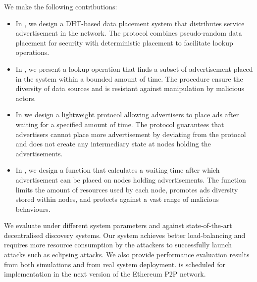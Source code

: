  We make the following contributions:
\begin{itemize}
    \item In , we design a DHT-based data placement system that distributes service advertisement in the network. The protocol combines pseudo-random data placement for security with deterministic placement to facilitate lookup operations. 
    \item In , we present a lookup operation that finds a subset of advertisement placed in the system within a bounded amount of time. The procedure ensure the diversity of data sources and is resistant against manipulation by malicious actors. 
    \item In  we design a lightweight protocol allowing advertisers to place ads after waiting for a specified amount of time. The protocol guarantees that advertisers cannot place more advertisement by deviating from the protocol and does not create any intermediary state at nodes holding the advertisements. 
    \item In , we design a function that calculates a waiting time after which advertisement can be placed on nodes holding advertisements. The function limits the amount of resources used by each node, promotes ads diversity stored within nodes, and protects against a vast range of malicious behaviours. 
\end{itemize}

We evaluate \sysname under different system parameters and against state-of-the-art decentralised discovery systems. Our system achieves better load-balancing and requires more resource consumption by the attackers to successfully launch attacks such as eclipsing attacks. We also provide performance evaluation results from both simulations and from real system deployment. \sysname is scheduled for implementation in the next version of the Ethereum P2P network. 

